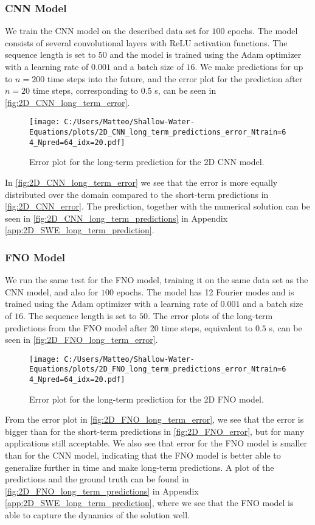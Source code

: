 \subsubsection*{CNN Model}
We train the CNN model on the described data set for $100$ epochs.
The model consists of several convolutional layers with ReLU activation functions.
The sequence length is set to $50$ and the model is trained using the Adam optimizer with a learning rate of $0.001$ and a batch size of $16$.
We make predictions for up to $n = 200$ time steps into the future, and the error plot for the prediction after $n = 20$ time steps, corresponding to $0.5$ s, can be seen in \autoref{fig:2D_CNN_long_term_error}.
\begin{figure}[H]
    \centering
    \texttt{[image: C:/Users/Matteo/Shallow-Water-Equations/plots/2D\_CNN\_long\_term\_predictions\_error\_Ntrain=64\_Npred=64\_idx=20.pdf]}
    \caption{Error plot for the long-term prediction for the 2D CNN model.}\label{fig:2D_CNN_long_term_error}
\end{figure}
In \autoref{fig:2D_CNN_long_term_error} we see that the error is more equally distributed over the domain compared to the short-term predictions in \autoref{fig:2D_CNN_error}.
The prediction, together with the numerical solution can be seen in \autoref{fig:2D_CNN_long_term_predictions} in Appendix \autoref{app:2D_SWE_long_term_prediction}.


\subsubsection*{FNO Model}
We run the same test for the FNO model, training it on the same data set as the CNN model, and also for $100$ epochs.
The model has 12 Fourier modes and is trained using the Adam optimizer with a learning rate of $0.001$ and a batch size of $16$.
The sequence length is set to $50$.
The error plots of the long-term predictions from the FNO model after 20 time steps, equivalent to $0.5$ s, can be seen in \autoref{fig:2D_FNO_long_term_error}.
\begin{figure}[H]
    \centering
    \texttt{[image: C:/Users/Matteo/Shallow-Water-Equations/plots/2D\_FNO\_long\_term\_predictions\_error\_Ntrain=64\_Npred=64\_idx=20.pdf]}
    \caption{Error plot for the long-term prediction for the 2D FNO model.}\label{fig:2D_FNO_long_term_error}
\end{figure}
From the error plot in \autoref{fig:2D_FNO_long_term_error}, we see that the error is bigger than for the short-term predictions in \autoref{fig:2D_FNO_error}, but for many applications still acceptable.
We also see that error for the FNO model is smaller than for the CNN model, indicating that the FNO model is better able to generalize further in time and make long-term predictions.
A plot of the predictions and the ground truth can be found in \autoref{fig:2D_FNO_long_term_predictions} in Appendix \autoref{app:2D_SWE_long_term_prediction}, where we see that the FNO model is able to capture the dynamics of the solution well.

